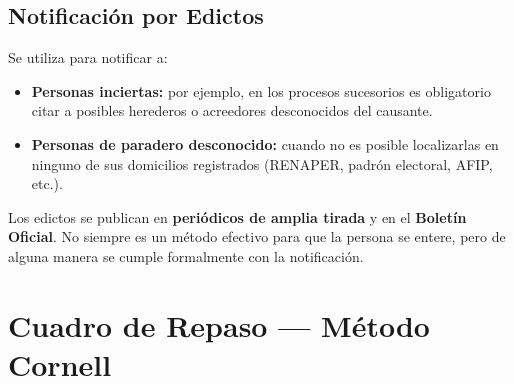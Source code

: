 \documentclass[12pt,oneside]{book}
\begin{document}
\section{Notificación por Edictos}

Se utiliza para notificar a:

\begin{itemize}
    \item \textbf{Personas inciertas:} por ejemplo, en los procesos sucesorios es obligatorio citar a posibles herederos o acreedores desconocidos del causante.
    \item \textbf{Personas de paradero desconocido:} cuando no es posible localizarlas en ninguno de sus domicilios registrados (RENAPER, padrón electoral, AFIP, etc.).
\end{itemize}

Los edictos se publican en \textbf{periódicos de amplia tirada} y en el \textbf{Boletín Oficial}. No siempre es un método efectivo para que la persona se entere, pero de alguna manera se cumple formalmente con la notificación.

\chapter{Cuadro de Repaso --- Método Cornell}
\end{document}
